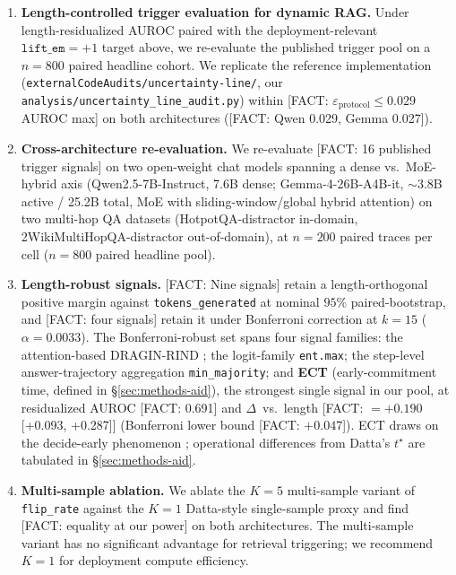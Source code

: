 \documentclass[11pt]{article}
\newcommand{\FACT}[1]{{\color{blue}\textsf{[FACT: #1]}}}
\begin{document}
\begin{enumerate}
\item \textbf{Length-controlled trigger evaluation for dynamic RAG.}
Under length-residualized AUROC
\citep{Vashurin_UncertaintyLineLengthInvariant} paired with the
deployment-relevant $\texttt{lift\_em}{=}+1$ target above, we re-evaluate
the published trigger pool on a $n{=}800$ paired headline cohort. We
replicate the reference implementation
(\texttt{externalCodeAudits/uncertainty-line/}, our
\texttt{analysis/uncertainty\_line\_audit.py}) within
\FACT{$\varepsilon_{\text{protocol}} \leq 0.029$ AUROC max} on both
architectures (\FACT{Qwen 0.029, Gemma 0.027}).

\item \textbf{Cross-architecture re-evaluation.} We re-evaluate
\FACT{16 published trigger signals} on two open-weight chat models spanning
a dense vs.\ MoE-hybrid axis
(Qwen2.5-7B-Instruct, 7.6B dense; Gemma-4-26B-A4B-it,
$\sim$3.8B active / 25.2B total, MoE with sliding-window/global hybrid
attention) on two multi-hop QA datasets (HotpotQA-distractor in-domain,
2WikiMultiHopQA-distractor out-of-domain), at
$n{=}200$ paired traces per cell ($n{=}800$ paired headline pool).

\item \textbf{Length-robust signals.}
\FACT{Nine signals} retain a length-orthogonal positive margin against
\texttt{tokens\_generated} at nominal $95\%$ paired-bootstrap, and
\FACT{four signals} retain it under Bonferroni correction at $k{=}15$
($\alpha=0.0033$). The Bonferroni-robust set spans four signal families:
the attention-based DRAGIN-RIND \citep{Su_DRAGIN}; the logit-family
\texttt{ent.max}; the step-level answer-trajectory aggregation
\texttt{min\_majority}; and \textbf{ECT} (early-commitment time, defined
in \S\ref{sec:methods-aid}), the strongest single signal in our pool, at
residualized AUROC \FACT{0.691} and $\Delta$~vs.\ length
\FACT{$={+}0.190$ [+0.093, +0.287]} (Bonferroni lower bound
\FACT{$+0.047$}). ECT draws on the decide-early phenomenon
\citep{Datta_DecideEarlyExplainLater, Wang_ChainOfProbeCoTStepByStep,
Chen_DynamicInstabilityLLMReasoning}; operational differences from
Datta's $t^\star$ are tabulated in \S\ref{sec:methods-aid}.

\item \textbf{Multi-sample ablation.} We ablate the $K{=}5$ multi-sample
variant of \texttt{flip\_rate} against the $K{=}1$ Datta-style single-sample
proxy and find \FACT{equality at our power} on both architectures.
The multi-sample variant has no significant advantage for retrieval
triggering; we recommend $K{=}1$ for deployment compute efficiency.


\end{enumerate}
\end{document}

